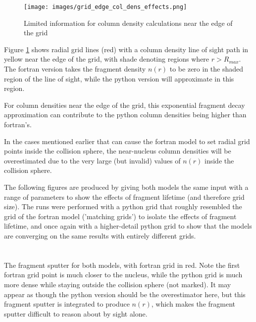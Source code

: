 \documentclass[11pt]{article}
\newcommand{\newproblem}[1]{\section*{\contour{mybblack}{\textcolor{myblack}{#1}}}}
\newcommand{\problempart}[1]{\subsection*{\contour{mybblack}{\textcolor{myblack}{#1}}}}
\begin{document}
\begin{multicols}{2}
\begin{figure}[H]
  \texttt{[image: images/grid\_edge\_col\_dens\_effects.png]}
  \caption{Limited information for column density calculations near the edge of the grid}
  \label{fig:grid_edge}
\end{figure}
Figure \ref{fig:grid_edge} shows radial grid lines (red) with a column density line of sight path in yellow near the edge of the grid, with shade denoting regions where \(r > R_{max}\).
The fortran version takes the fragment density \(n(r)\) to be zero in the shaded region of the line of sight, while the python version will approximate in this region.

For column densities near the edge of the grid, this exponential fragment decay approximation can contribute to the python column densities being higher than fortran's.
\end{multicols}

In the cases mentioned earlier that can cause the fortran model to set radial grid points inside the collision sphere, the near-nucleus column densities will be overestimated due to the very large (but invalid) values of \(n(r)\) inside the collision sphere.


\newpage

The following figures are produced by giving both models the same input with a range of parameters to show the effects of fragment lifetime (and therefore grid size).
The runs were performed with a python grid that roughly resembled the grid of the fortran model ('matching grids') to isolate the effects of fragment lifetime, and once again with a higher-detail python grid to show that the models are converging on the same results with entirely different grids.
\newproblem{Effect of Matching Grids, Fragment Lifetime 20000 s}
\problempart{Fragment Sputter}

The fragment sputter for both models, with fortran grid in red.
Note the first fortran grid point is much closer to the nucleus, while the python grid is much more dense while staying outside the collision sphere (not marked).
It may appear as though the python version should be the overestimator here, but this fragment sputter is integrated to produce \(n(r)\), which makes the fragment sputter difficult to reason about by sight alone.
\end{document}
